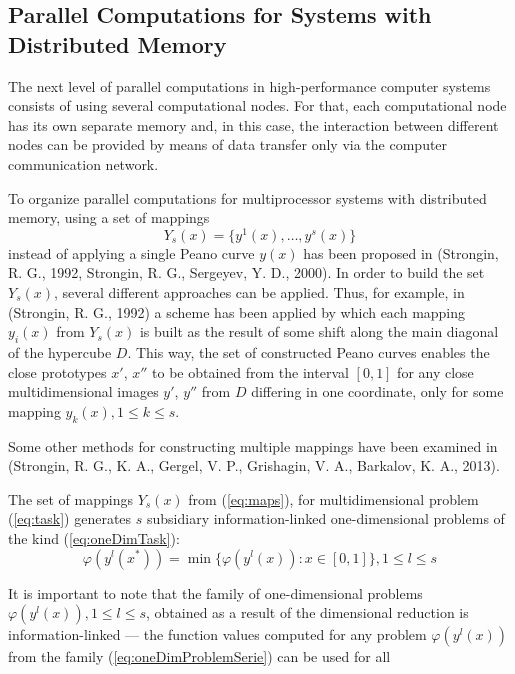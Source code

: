 \documentclass{gOMS2e}
\theoremstyle{plain}%
\theoremstyle{definition}
\theoremstyle{remark}
\begin{document}
\subsection{Parallel Computations for Systems with Distributed Memory}
\label{subsec:distribpar}
The next level of parallel computations in high-performance computer systems consists of
using several computational nodes. For that, each computational node has its own separate
memory and, in this case, the interaction between different nodes can be provided by
means of data transfer only via the computer communication network.
\par
To organize parallel computations for multiprocessor systems with distributed memory, using a set of mappings
\begin{equation}
  \label{eq:maps}
Y_s(x)=\{y^1(x),\dots,y^s(x)\}
\end{equation}
instead of applying a single Peano curve \(y(x)\) has been proposed in (Strongin, R. G., 1992, Strongin, R. G., Sergeyev, Y. D., 2000).
In order to build the set \(Y_s(x)\), several different approaches can be applied.
Thus, for example, in (Strongin, R. G., 1992) a scheme has been applied by which each
mapping \(y_i(x)\) from \(Y_s(x)\) is built as the result of some shift along the main
diagonal of the hypercube \(D\). This way, the set of constructed Peano curves enables the
close prototypes \(x'\), \(x''\)  to be obtained from the interval \([0,1]\) for any close
multidimensional images \(y'\), \(y''\) from \(D\) differing in one coordinate,
only for some mapping \(y_k(x), 1\leqslant k\leqslant s\).
\par
Some other methods for constructing multiple mappings have been examined in (Strongin, R. G., K. A., Gergel, V. P., Grishagin, V. A., Barkalov, K. A.,  2013).
\par
The set of mappings \(Y_s(x)\) from (\ref{eq:maps}), for multidimensional problem (\ref{eq:task})
generates \(s\) subsidiary information-linked one-dimensional problems of the kind (\ref{eq:oneDimTask}):
\begin{equation}
  \label{eq:oneDimProblemSerie}
  \varphi(y^l(x^*))=\min\{\varphi(y^l(x)):x\in [0,1]\},1\leqslant l\leqslant s
\end{equation}
\par
It is important to note that the family of one-dimensional problems \(\varphi(y^l(x)),1\leqslant l\leqslant s\),
obtained as a result of the dimensional reduction is information-linked --- the function
values computed for any problem \(\varphi(y^l(x))\) from the family (\ref{eq:oneDimProblemSerie}) can be used for all
\end{document}
